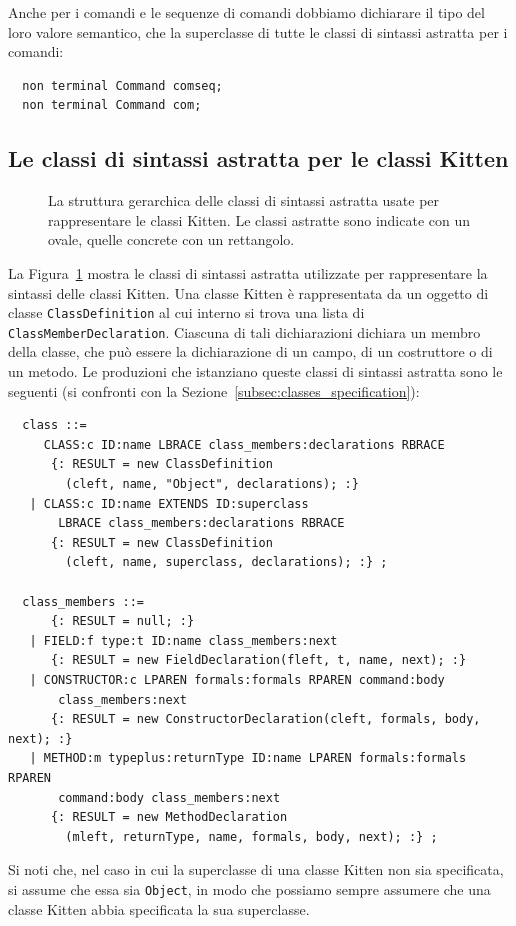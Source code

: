 Anche per i comandi e le sequenze di comandi
dobbiamo dichiarare il tipo del loro valore semantico, che \e la
superclasse di tutte le classi di sintassi astratta per i comandi:
%
\begin{verbatim}
  non terminal Command comseq;
  non terminal Command com;
\end{verbatim}
%
\subsection{Le classi di sintassi astratta per le classi Kitten}
  \label{subsec:classes_abstract}
%
\begin{figure}[t]
\begin{center}
\end{center}
\caption{La struttura gerarchica delle classi di sintassi astratta usate
         per rappresentare le classi Kitten.
         Le classi astratte sono indicate con un
         ovale, quelle concrete con un rettangolo.}
  \label{fig:classes_hierarchy}
\end{figure}
%
La Figura~\ref{fig:classes_hierarchy} mostra le classi di sintassi astratta
utilizzate per rappresentare la sintassi delle classi
Kitten. Una classe Kitten \`e rappresentata da un oggetto
di classe \texttt{ClassDefinition} al cui interno si trova una
lista di \texttt{ClassMemberDeclaration}. Ciascuna di tali dichiarazioni
dichiara un membro della classe, che pu\`o essere la dichiarazione di
un campo, di un costruttore o di un metodo.
Le produzioni che istanziano queste classi di sintassi astratta sono le
seguenti (si confronti con la Sezione~\ref{subsec:classes_specification}):
%
\begin{verbatim}
  class ::=
     CLASS:c ID:name LBRACE class_members:declarations RBRACE
      {: RESULT = new ClassDefinition
        (cleft, name, "Object", declarations); :}
   | CLASS:c ID:name EXTENDS ID:superclass
       LBRACE class_members:declarations RBRACE
      {: RESULT = new ClassDefinition
        (cleft, name, superclass, declarations); :} ;

  class_members ::=
      {: RESULT = null; :}
   | FIELD:f type:t ID:name class_members:next
      {: RESULT = new FieldDeclaration(fleft, t, name, next); :}
   | CONSTRUCTOR:c LPAREN formals:formals RPAREN command:body
       class_members:next
      {: RESULT = new ConstructorDeclaration(cleft, formals, body, next); :}
   | METHOD:m typeplus:returnType ID:name LPAREN formals:formals RPAREN
       command:body class_members:next
      {: RESULT = new MethodDeclaration
        (mleft, returnType, name, formals, body, next); :} ;
\end{verbatim}
%
Si noti che, nel caso in cui la superclasse di una classe Kitten non sia
specificata, si assume che essa sia \texttt{Object}, in modo che possiamo
sempre assumere che una classe Kitten abbia specificata la sua superclasse.

